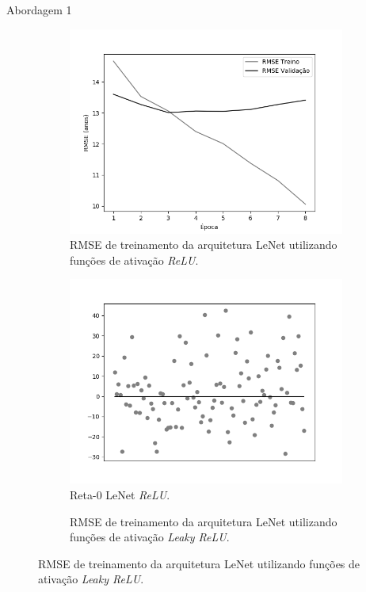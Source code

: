 \begin{frame}{Abordagem 1}
\begin{figure}[h!]
  \caption{Resultados do treinamento e teste da CNN LeNet de acordo com a Abordagem 1.}\label{fig:lenet-abordagem1}
  \begin{subfigure}[hb]{0.25\linewidth}
    \caption{RMSE de treinamento da arquitetura LeNet utilizando funções de ativação \emph{ReLU}.}

    \includegraphics[width=\linewidth]{img/graficos/history/lenet/fig-history-image-treat-1-lenet-relu-rmse.png}%
  \end{subfigure}%
  \begin{subfigure}[hb]{0.25\linewidth}
    \caption{Reta-0 LeNet \emph{ReLU}.}

    \includegraphics[width=\linewidth]{img/graficos/reta0/lenet/fig-reta-0-image-treat-1-lenet-relu.png}%
  \end{subfigure}
  \begin{subfigure}[hb]{0.25\linewidth}
    \caption{RMSE de treinamento da arquitetura LeNet utilizando funções de ativação \emph{Leaky ReLU}.}


\end{subfigure}
\end{figure}
\end{frame}
